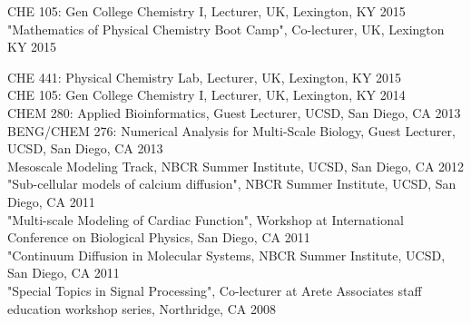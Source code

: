 \documentclass{res} %
\begin{document}
\begin{resume}
\vspace{15pt} %
CHE 105: Gen College Chemistry I, Lecturer, UK, Lexington, KY \hfill 2015 \\

"Mathematics of Physical Chemistry Boot Camp", Co-lecturer, UK, Lexington KY \hfill 2015

CHE 441: Physical Chemistry Lab, Lecturer, UK, Lexington, KY \hfill 2015 \\

CHE 105: Gen College Chemistry I, Lecturer, UK, Lexington, KY \hfill 2014 \\

CHEM 280: Applied Bioinformatics, Guest Lecturer, UCSD, San Diego, CA \hfill 2013 \\

BENG/CHEM 276: Numerical Analysis for Multi-Scale Biology, Guest Lecturer, UCSD, San Diego, CA \hfill 2013 \\

Mesoscale Modeling Track, NBCR Summer Institute, UCSD, San Diego, CA \hfill 2012 \\

"Sub-cellular models of calcium diffusion", NBCR Summer Institute, UCSD, San Diego, CA \hfill 2011 \\

"Multi-scale Modeling of Cardiac Function", Workshop at International Conference on Biological Physics, San Diego, CA \hfill 2011 \\

"Continuum Diffusion in Molecular Systems, NBCR Summer Institute, UCSD, San Diego, CA \hfill 2011 \\

"Special Topics in Signal Processing", Co-lecturer at Arete Associates staff education workshop series, Northridge, CA \hfill 2008 \\








\vspace{0.2in} %

\newpage

\end{resume}
\end{document}
